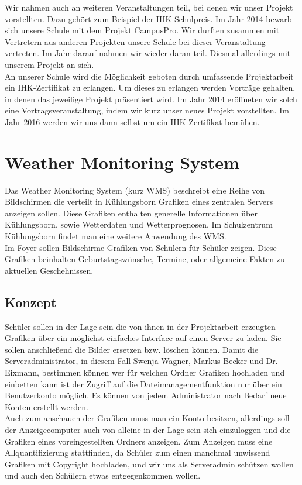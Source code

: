 \documentclass[a4paper,oneside,12pt,titlepage]{article}
\begin{document}
Wir nahmen auch an weiteren Veranstaltungen teil, bei denen wir unser Projekt vorstellten. Dazu gehört zum Beispiel der IHK-Schulpreis. Im Jahr 2014 bewarb sich unsere Schule mit dem Projekt CampusPro. Wir durften zusammen mit Vertretern aus anderen Projekten unsere Schule bei dieser Veranstaltung vertreten. Im Jahr darauf nahmen wir wieder daran teil. Diesmal allerdings mit unserem Projekt an sich.\\ An unserer Schule wird die Möglichkeit geboten durch umfassende Projektarbeit ein IHK-Zertifikat zu erlangen. Um dieses zu erlangen werden Vorträge gehalten, in denen das jeweilige Projekt präsentiert wird. Im Jahr 2014 eröffneten wir solch eine Vortragsveranstaltung, indem wir kurz unser neues Projekt vorstellten. Im Jahr 2016 werden wir uns dann selbst um ein IHK-Zertifikat bemühen.

\section{Weather Monitoring System}
Das Weather Monitoring System (kurz WMS) beschreibt eine Reihe von Bildschirmen die verteilt in Kühlungsborn Grafiken eines zentralen Servers anzeigen sollen. Diese Grafiken enthalten generelle Informationen über Kühlungsborn, sowie Wetterdaten und Wetterprognosen. Im Schulzentrum Kühlungsborn findet man eine weitere Anwendung des WMS. \\
Im Foyer sollen Bildschirme Grafiken von Schülern für Schüler zeigen. Diese Grafiken beinhalten Geburtstagswünsche, Termine, oder allgemeine Fakten zu aktuellen Geschehnissen.

\subsection{Konzept} %
Schüler sollen in der Lage sein die von ihnen in der Projektarbeit erzeugten Grafiken über ein möglichst einfaches Interface auf einen Server zu laden. Sie sollen anschließend die Bilder ersetzen bzw. löschen können. Damit die Serveradministrator, in diesem Fall Swenja Wagner, Markus Becker und Dr. Eixmann, bestimmen können wer für welchen Ordner Grafiken hochladen und einbetten kann ist der Zugriff auf die Dateimanagementfunktion nur über ein Benutzerkonto möglich. Es können von jedem Administrator nach Bedarf neue Konten erstellt werden. \\
Auch zum anschauen der Grafiken muss man ein Konto besitzen, allerdings soll der Anzeigecomputer auch von alleine in der Lage sein sich einzuloggen und die Grafiken eines voreingestellten Ordners anzeigen. Zum Anzeigen muss eine Allquantifizierung stattfinden, da Schüler zum einen manchmal unwissend Grafiken mit Copyright hochladen, und wir uns als Serveradmin schützen wollen und auch den Schülern etwas entgegenkommen wollen.
\end{document}
